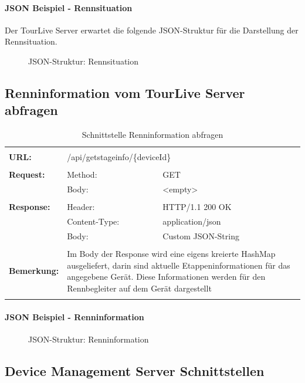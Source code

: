 \paragraph{JSON Beispiel - Rennsituation}
Der TourLive Server erwartet die folgende JSON-Struktur für die Darstellung der Rennsituation.
\begin{figure}[H]
	\centering
	
	\caption{JSON-Struktur: Rennsituation}
\end{figure}

\newpage
\subsection{Renninformation vom TourLive Server abfragen}
\begin{longtable}{ p{2.5cm} || p{3.5cm} p{5.5cm}}
&  \\ [-1.5ex]
	\textbf{URL:} & \multicolumn{2}{p{9cm}}{/api/getstageinfo/\{deviceId\}}  \\ [1ex] \hline & &  \\ [-1.5ex]
	\textbf{Request:} & Method: & GET \\
		& Body: & <empty> \\ [1ex] \hline & &  \\ [-1.5ex]
	\textbf{Response:} & Header: & HTTP/1.1 200 OK \\
		& Content-Type: & application/json \\
		& Body: & Custom JSON-String  \\ [1ex] \hline & &  \\ [-1.5ex]
	\textbf{Bemerkung:} & \multicolumn{2}{p{9cm}}{Im Body der Response wird eine eigens kreierte HashMap ausgeliefert, darin sind aktuelle Etappeninformationen für das angegebene Gerät. Diese Informationen werden für den Rennbegleiter auf dem Gerät dargestellt} \\ [1ex] 
\caption{Schnittstelle Renninformation abfragen}
\end{longtable}

\paragraph{JSON Beispiel - Renninformation}
\begin{figure}[H]
	\centering
	
	\caption{JSON-Struktur: Renninformation}
\end{figure}

\newpage
\subsection{Device Management Server Schnittstellen}

